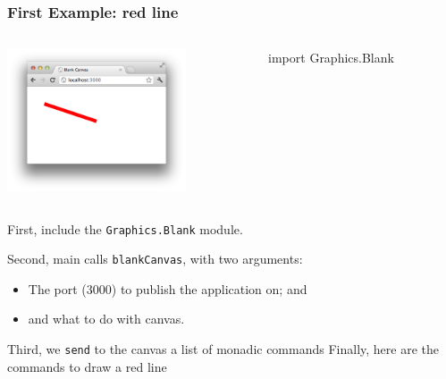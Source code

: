 \documentclass{beamer}
\begin{document}
\begin{frame}[fragile]
\frametitle{First Example: red line}
\Large



\begin{columns}
\begin{column}{0.40\textwidth}
\includegraphics[width=150pt]{red-line.png}
\end{column}
\begin{column}{0.60\textwidth}
\begin{codeblock}[0.95]
\footnotesize
\begin{semiverbatim}
import Graphics.Blank
\end{semiverbatim}
\end{codeblock}
\end{column}
\end{columns}

\frameskip{}
%
{First, include the {\tt Graphics.Blank} module.}
%
{Second, main calls {\tt blankCanvas}, with two arguments:%
\begin{itemize}
\item The port (3000) to publish the application on; and
\item and what to do with canvas.
\end{itemize}
}
%
{Third, we {\tt send} to the canvas a list of monadic commands}
%
{Finally, here are the commands to draw a {\color{red}red} line}

\end{frame}
\end{document}
